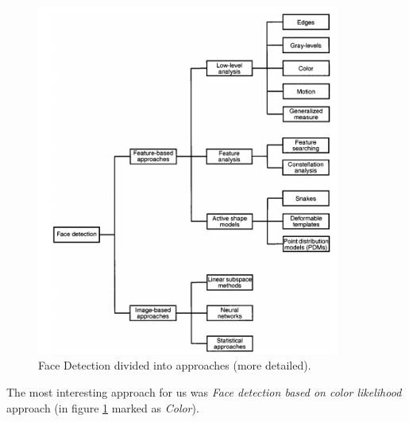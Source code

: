 \documentclass[Bachelorarbeit.tex]{subfiles}
\begin{document}
\begin{figure}[!h] %
\centering
\includegraphics[width=10cm]{./pictures/FaceDetectionApproaches}
\caption{Face Detection divided into approaches (more detailed). \label{FDaS}}
\end{figure}

The most interesting approach for us was \textit{Face detection based on color likelihood} approach (in figure \ref{FDaS} marked as \textit{Color}).
\end{document}
